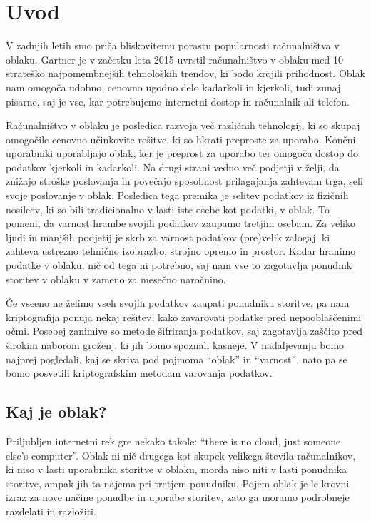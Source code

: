\documentclass[12pt,a4paper,openany,tikz]{book}
\theoremstyle{plain}
\theoremstyle{definition}
\begin{document}
\pagestyle{fancy}
\setcounter{page}{1}
\chapter{Uvod}

V zadnjih letih smo priča bliskovitemu porastu popularnosti računalništva v oblaku. Gartner je v začetku leta 2015 uvrstil računalništvo v oblaku med 10 strateško najpomembnejših tehnoloških trendov, ki bodo krojili prihodnost. Oblak nam omogoča udobno, cenovno ugodno delo kadarkoli in kjerkoli, tudi zunaj pisarne, saj je vse, kar potrebujemo internetni dostop in računalnik ali telefon.

Računalništvo v oblaku je posledica razvoja več različnih tehnologij, ki so skupaj omogočile cenovno učinkovite rešitve, ki so hkrati preproste za uporabo. Končni uporabniki uporabljajo oblak, ker je preprost za uporabo ter omogoča dostop do podatkov kjerkoli in kadarkoli. Na drugi strani vedno več podjetji v želji, da znižajo stroške poslovanja in povečajo sposobnost prilagajanja zahtevam trga, seli svoje poslovanje v oblak. Posledica tega premika je selitev podatkov iz fizičnih nosilcev, ki so bili tradicionalno v lasti iste osebe kot podatki, v oblak. To pomeni, da varnost hrambe svojih podatkov zaupamo tretjim osebam. Za veliko ljudi in manjših podjetij je skrb za varnost podatkov (pre)velik zalogaj, ki zahteva ustrezno tehnično izobrazbo, strojno opremo in prostor. Kadar hranimo podatke v oblaku, nič od tega ni potrebno, saj nam vse to zagotavlja ponudnik storitev v oblaku v zameno za mesečno naročnino.

Če vseeno ne želimo vseh svojih podatkov zaupati ponudniku storitve, pa nam kriptografija ponuja nekaj rešitev, kako zavarovati podatke pred nepooblaščenimi očmi. Posebej zanimive so metode šifriranja podatkov, saj zagotavlja zaščito pred širokim naborom groženj, ki jih bomo spoznali kasneje. V nadaljevanju bomo najprej pogledali, kaj se skriva pod pojmoma ``oblak'' in ``varnost'', nato pa se bomo posvetili kriptografskim metodam varovanja podatkov.

\section{Kaj je oblak?}
\label{sec:Kaj je oblak?}


Priljubljen internetni rek gre nekako takole: “there is no cloud, just someone else's computer”. Oblak ni nič drugega kot skupek velikega števila računalnikov, ki niso v lasti uporabnika storitve v oblaku, morda niso niti v lasti ponudnika storitve, ampak jih ta najema pri tretjem ponudniku. Pojem oblak je le krovni izraz za nove načine ponudbe in uporabe storitev, zato ga moramo podrobneje razdelati in razložiti.
\end{document}
